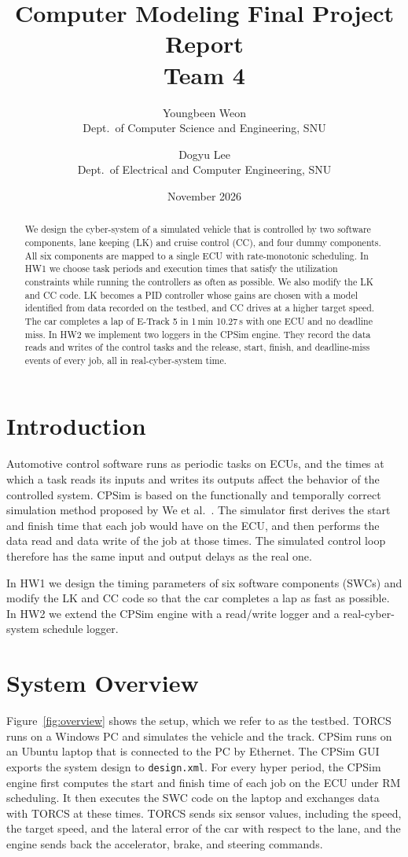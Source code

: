 \documentclass[11pt,a4paper]{article}
\title{Computer Modeling Final Project Report\\[4pt]\large Team 4}
\author{Youngbeen Weon\\{\small Dept.\ of Computer Science and Engineering, SNU}
\and Dogyu Lee\\{\small Dept.\ of Electrical and Computer Engineering, SNU}}
\date{November 2026}
\begin{document}
\maketitle

\begin{abstract}
We design the cyber-system of a simulated vehicle that is controlled by two software
components, lane keeping (LK) and cruise control (CC), and four dummy components. All six
components are mapped to a single ECU with rate-monotonic scheduling. In HW1 we choose task
periods and execution times that satisfy the utilization constraints while running the
controllers as often as possible. We also modify the LK and CC code. LK becomes a PID controller
whose gains are chosen with a model identified from data recorded on the testbed, and CC drives
at a higher target speed. The car completes a lap of E-Track 5 in 1\,min 10.27\,s with one ECU and no
deadline miss. In HW2 we implement two loggers in the CPSim engine. They record the data reads and
writes of the control tasks and the release, start, finish, and deadline-miss events of every
job, all in real-cyber-system time.
\end{abstract}

\section{Introduction}
Automotive control software runs as periodic tasks on ECUs, and the times at which a task reads
its inputs and writes its outputs affect the behavior of the controlled system. CPSim is based on
the functionally and temporally correct simulation method proposed by We et al.~\cite{we2017functionally}. The
simulator first derives the start and finish time that each job would have on the ECU, and
then performs the data read and data write of the job at those times. The simulated control loop
therefore has the same input and output delays as the real one.

In HW1 we design the timing parameters of six software components (SWCs) and modify the LK and CC
code so that the car completes a lap as fast as possible. In HW2 we extend the CPSim engine with a
read/write logger and a real-cyber-system schedule logger.

\section{System Overview}
Figure~\ref{fig:overview} shows the setup, which we refer to as the testbed. TORCS runs on a
Windows PC and simulates the vehicle and the track. CPSim runs on an Ubuntu laptop that is connected
to the PC by Ethernet. The CPSim GUI exports the system design to \texttt{design.xml}. For every hyper
period, the CPSim engine first computes the start and finish time of each job on the ECU under RM
scheduling. It then executes the SWC code on the laptop and exchanges data with TORCS at these
times. TORCS sends six sensor values, including the speed, the target speed, and the lateral error
of the car with respect to the lane, and the engine sends back the accelerator, brake, and steering
commands.
\end{document}

